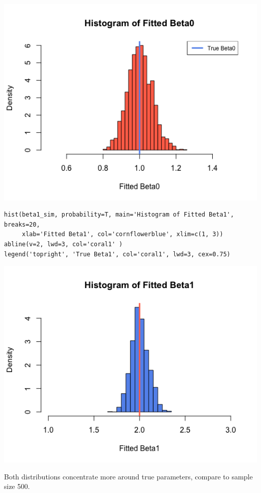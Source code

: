 \documentclass[12pt,letterpaper]{article}
\begin{document}
\includegraphics[width=150mm]{hist_beta0_2.png}

\begin{verbatim}
hist(beta1_sim, probability=T, main='Histogram of Fitted Beta1', breaks=20,
     xlab='Fitted Beta1', col='cornflowerblue', xlim=c(1, 3))
abline(v=2, lwd=3, col='coral1' )
legend('topright', 'True Beta1', col='coral1', lwd=3, cex=0.75)
\end{verbatim}

\includegraphics[width=150mm]{hist_beta1_2.png}

\noindent Both distributions concentrate more around true parameters, compare to sample size 500.
\end{document}
